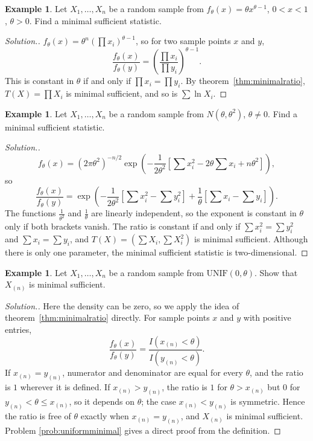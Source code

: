 \documentclass[12pt,a4paper]{report}
\theoremstyle{definition}
\newtheorem{exa}[thm]{Example}
\newenvironment{solution}
  {\renewcommand{\qedsymbol}{}\begin{proof}[\textit{Solution}.]}
  {\end{proof}}
\begin{document}
\begin{exa}
\label{ex:powerminimal}
Let $X_1, \dots, X_n$ be a random sample from $f_\theta(x) = \theta x^{\theta - 1}$,
$0<x<1$, $\theta>0$. Find a minimal sufficient statistic.
\end{exa}

\begin{solution}
$f_\theta(x) = \theta^n\left(\prod x_i\right)^{\theta - 1}$, so for two sample points
$x$ and $y$,
\[\frac{f_\theta(x)}{f_\theta(y)} = \left(\frac{\prod x_i}{\prod y_i}\right)^{\theta - 1} .\]
This is constant in $\theta$ if and only if $\prod x_i = \prod y_i$. By
theorem~\ref{thm:minimalratio}, $T(X) = \prod X_i$ is minimal sufficient, and so is
$\sum\ln X_i$.
\end{solution}

\begin{exa}
\label{ex:normalthetaminimal}
Let $X_1, \dots, X_n$ be a random sample from $N(\theta, \theta^2)$, $\theta\ne 0$.
Find a minimal sufficient statistic.
\end{exa}

\begin{solution}
\[f_\theta(x) = (2\pi\theta^2)^{-n/2}\exp\left(-\frac{1}{2\theta^2}\left[\sum x_i^2 - 2\theta\sum x_i + n\theta^2\right]\right),\]
so
\[\frac{f_\theta(x)}{f_\theta(y)} = \exp\left(-\frac{1}{2\theta^2}\left[\sum x_i^2 - \sum y_i^2\right]
+ \frac1\theta\left[\sum x_i - \sum y_i\right]\right).\]
The functions $\frac{1}{\theta^2}$ and $\frac1\theta$ are linearly independent, so the
exponent is constant in $\theta$ only if both brackets vanish. The ratio is
constant if and only if $\sum x_i^2 = \sum y_i^2$ and $\sum x_i = \sum y_i$, and
$T(X) = \left(\sum X_i, \sum X_i^2\right)$ is minimal sufficient. Although there is
only one parameter, the minimal sufficient statistic is two-dimensional.
\end{solution}

\begin{exa}
\label{ex:uniformminimal}
Let $X_1, \dots, X_n$ be a random sample from $\text{UNIF}(0, \theta)$. Show that
$X_{(n)}$ is minimal sufficient.
\end{exa}

\begin{solution}
Here the density can be zero, so we apply the idea of theorem~\ref{thm:minimalratio}
directly. For sample points $x$ and $y$ with positive entries,
\[\frac{f_\theta(x)}{f_\theta(y)} = \frac{I\left(x_{(n)}<\theta\right)}{I\left(y_{(n)}<\theta\right)} .\]
If $x_{(n)} = y_{(n)}$, numerator and denominator are equal for every $\theta$, and
the ratio is $1$ wherever it is defined. If $x_{(n)}>y_{(n)}$, the ratio is $1$ for
$\theta>x_{(n)}$ but $0$ for $y_{(n)}<\theta\le x_{(n)}$, so it depends on $\theta$;
the case $x_{(n)}<y_{(n)}$ is symmetric. Hence the ratio is free of $\theta$
exactly when $x_{(n)} = y_{(n)}$, and $X_{(n)}$ is minimal sufficient. Problem
\ref{prob:uniformminimal} gives a direct proof from the definition.
\end{solution}
\end{document}
